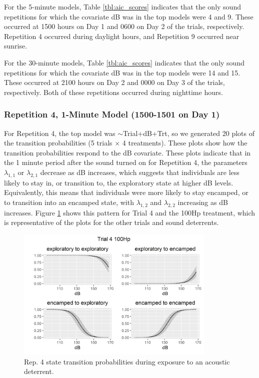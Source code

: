 \documentclass[12pt]{article}
\begin{document}
		For the 5-minute models, Table \ref{tbl:aic_scores} indicates that the only sound repetitions for which the covariate dB was in the top models were 4 and 9. These occurred at 1500 hours on Day 1 and 0600 on Day 2 of the trials, respectively. Repetition 4 occurred during daylight hours, and Repetition 9 occurred near sunrise.
		
		For the 30-minute models, Table \ref{tbl:aic_scores} indicates that the only sound repetitions for which the covariate dB was in the top models were 14 and 15. These occurred at 2100 hours on Day 2 and 0000 on Day 3 of the trials, respectively. Both of these repetitions occurred during nighttime hours.
		
		\subsubsection{Repetition 4, 1-Minute Model (1500-1501 on Day 1)}
			
			For Repetition 4, the top model was $\sim$Trial+dB+Trt, so we generated 20 plots of the transition probabilities (5 trials $\times$ 4 treatments). These plots show how the transition probabilities respond to the dB covariate. These plots indicate that in the 1 minute period after the sound turned on for Repetition 4, the parameters $\lambda_{1, 1}$ or $\lambda_{2, 1}$ decrease as dB increases, which suggests that individuals are less likely to stay in, or transition to, the exploratory state at higher dB levels. Equivalently, this means that individuals were more likely to stay encamped, or to transition into an encamped state, with $\lambda_{1, 2}$ and $\lambda_{2, 2}$ increasing as dB increases. Figure \ref{img:rep4_1min_trans_tmnt} shows this pattern for Trial 4 and the 100Hp treatment, which is representative of the plots for the other trials and sound deterrents.
			
			\begin{figure}
				\centering
				\includegraphics[width=0.85\textwidth]{trans_rep_4_trial_4_100Hp.png}
				\caption{Rep. 4 state transition probabilities during exposure to an acoustic deterrent.}
				\label{img:rep4_1min_trans_tmnt}
			\end{figure}
			
\end{document}
